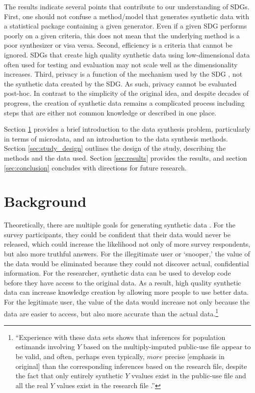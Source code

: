 \documentclass[runningheads]{llncs}
\begin{document}
The results indicate several points that contribute to our understanding of SDGs.  First, one should not confuse a method/model that generates synthetic data with a statistical package containing a given generator.  Even if a given SDG performs poorly on a given criteria, this does not mean that the underlying method is a poor synthesizer or visa versa.  Second, efficiency is a criteria that cannot be ignored.  SDGs that create high quality synthetic data using low-dimensional data often used for testing and evaluation may not scale well as the dimensionality increases.   Third, privacy is a function of the mechanism used by the SDG \cite{jordon2022synthetic}, not the synthetic data created by the SDG.  As such, privacy cannot be evaluated post-hoc.  In contrast to the simplicity of the original idea, and despite decades of progress, the creation of synthetic data remains a complicated process including steps that are either not common knowledge or described in one place.

Section \ref{sec:background} provides a brief introduction to the data synthesis problem, particularly in terms of microdata, and an introduction to the data synthesis methods. Section \ref{sec:study_design} outlines the design of the study, describing the methods and the data used. Section \ref{sec:results} provides the results, and section \ref{sec:conclusion} concludes with directions for future research.

\section{Background}\label{sec:background}

Theoretically, there are multiple goals for generating synthetic data \cite{rubin1993statistical}.  For the survey participants, they could be confident that their data would never be released, which could increase the likelihood not only of more survey respondents, but also more truthful answers.  For the illegitimate user or `snooper,' the value of the data would be eliminated because they could not discover actual, confidential information.  For the researcher, synthetic data can be used to develop code before they have access to the original data.  As a result, high quality synthetic data can increase knowledge creation by allowing more people to use better data.  For the legitimate user, the value of the data would increase not only because the data are easier to access, but also more accurate than the actual data.\footnote{``Experience with these data sets shows that inferences for population estimands involving $Y$ based on the multiply-imputed public-use file appear to be valid, and often, perhaps even typically, $more$ precise [emphasis in original] than the corresponding inferences based on the research file, despite the fact that only entirely synthetic $Y$ vvalues exist in the public-use file and all the real $Y$ values exist in the research file \cite[pg. 466]{rubin1993statistical}.''}  
\end{document}
